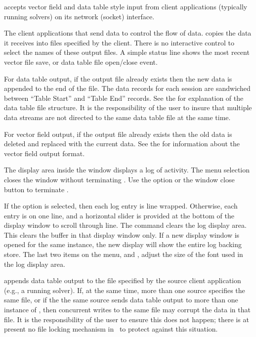  accepts vector field and data table style input from
client applications (typically running solvers) on its network (socket)
interface.

The client applications that send data to  control the
flow of data.   copies the data it receives into files
specified by the client.  There is no interactive control to select the
names of these output files.  A simple status line shows the most recent
vector file save, or data table file open/close event.

For data table output, if the output file already exists then the new
data is appended to the end of the file.  The data records for each
session are sandwiched between ``Table Start'' and ``Table End''
records.  See the  for
explanation of the data table file structure.  It is the
responsibility of the user to insure that multiple data streams are
not directed to the same data table file at the same time.

For vector field output, if the output file already exists then the
old data is deleted and replaced with the current data.  See the
 for information
about the vector field output format.



The display area inside the  window displays a log of
 activity.  The menu selection  closes the  window without terminating
.  Use the  option or the
window close button to terminate .

If the  option is selected, then each log
entry is line wrapped.  Otherwise, each entry is on one line, and a
horizontal slider is provided at the bottom of the display window to
scroll through line.  The  command
clears the log display area.  This clears the buffer in that
 display window only.  If a new display window is
opened for the same  instance, the new display will
show the entire log backing store.  The last two items on the
 menu,   and , adjust
the size of the font used in the log display area.

 appends data table output to the file specified by the
source client application (e.g., a running solver).  If, at the same
time, more than one source specifies the same file, or if the the same
source sends data table output to more than one instance of
, then concurrent writes to the same file may corrupt the
data in that file.  It is the responsibility of the user to ensure this
does not happen; there is at present no file locking mechanism in
\OOMMF\ to protect against this situation.
